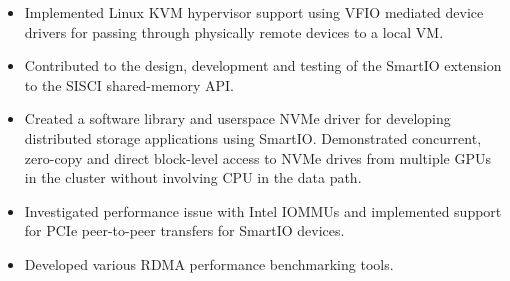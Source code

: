 {	\bigskip
	\begin{itemize}
		\item{Implemented Linux KVM hypervisor support using VFIO mediated device drivers
			for passing through physically remote devices to a local VM.}\\[-.6em]
		\item{Contributed to the design, development and testing of the SmartIO
			extension to the SISCI shared-memory API.}\\[-.6em]
		\item{Created a software library and userspace NVMe driver 
			for developing distributed storage applications using SmartIO.
			Demonstrated concurrent, zero-copy and direct block-level access to NVMe drives from
			multiple GPUs in the cluster without involving CPU in the data path.}\\[-.6em]
		\item{Investigated performance issue with Intel IOMMUs and
			implemented support for PCIe peer-to-peer transfers for SmartIO devices.}\\[-.6em]
		\item{Developed various RDMA performance benchmarking tools.}
	\end{itemize}
	\bigskip
	\bigskip
}

